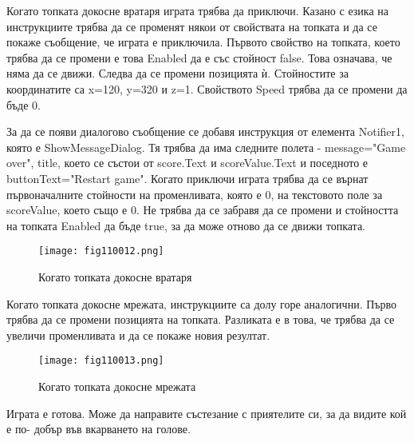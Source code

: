 Когато топката докосне вратаря играта трябва да приключи. Казано с езика на инструкциите трябва да се променят някои от свойствата на топката и да се покаже съобщение, че играта е приключила. Първото свойство на топката, което трябва да се промени е това Enabled да е със стойност false. Това означава, че няма да се движи. Следва да се промени позицията ѝ. Стойностите за координатите са x=120, y=320 и z=1. Свойството Speed трябва да се промени да бъде 0.

За да се появи диалогово съобщение се добавя инструкция от елемента Notifier1, която е ShowMessageDialog. Тя трябва да има следните полета - message="Game over", title, което се състои от score.Text и scoreValue.Text и поседното е buttonText="Restart game". Когато приключи играта трябва да се върнат първоначалните стойности на променливата, която е 0, на текстовото поле за scoreValue, което също е 0. Не трябва да се забравя да се промени и стойността на топката Enabled да бъде true, за да може отново да се движи топката.

\begin{figure}[H]
  \centering
  \texttt{[image: fig110012.png]}
  \caption{Когато топката докосне вратаря}
\label{fig110012}
\end{figure}

Когато топката докосне мрежата, инструкциите са долу горе аналогични. Първо трябва да се промени позицията на топката. Разликата е в това, че трябва да се увеличи променливата и да се покаже новия резултат.

\begin{figure}[H]
  \centering
  \texttt{[image: fig110013.png]}
  \caption{Когато топката докосне мрежата}
\label{fig110013}
\end{figure}

Играта е готова. Може да направите състезание с приятелите си, за да видите кой е по- добър във вкарването на голове.